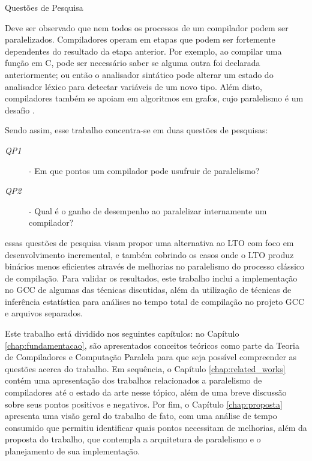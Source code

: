 \begin{section}{Questões de Pesquisa}

Deve ser observado que nem todos os processos de um compilador podem ser
paralelizados. Compiladores operam em etapas que podem ser fortemente
dependentes do resultado da etapa anterior. Por exemplo, ao compilar uma
função em C, pode ser necessário saber se alguma outra foi declarada anteriormente; ou
então o analisador sintático pode alterar um estado do analisador léxico para
detectar variáveis de um novo tipo. Além disto, compiladores também se apoiam em algoritmos
em grafos, cujo paralelismo é um desafio \citep{lumsdaine2007challenges}.

Sendo assim, esse trabalho concentra-se em duas questões de pesquisas:
\begin{description}
    \item[\textit{QP1}] - Em que pontos um compilador pode usufruir de paralelismo?

    \item[\textit{QP2}] - Qual é o ganho de desempenho ao paralelizar internamente um compilador?
\end{description}
essas questões de pesquisa visam propor uma alternativa ao LTO com foco
em desenvolvimento incremental, e também cobrindo os casos onde o LTO produz binários menos
eficientes através de melhorias no paralelismo do processo clássico de compilação.
Para validar os resultados, este trabalho inclui a implementação no GCC de algumas das
técnicas discutidas, além da utilização de técnicas de inferência estatística para
análises no tempo total de compilação no projeto GCC e arquivos separados.

Este trabalho está dividido nos seguintes capítulos: no Capítulo
\ref{chap:fundamentacao}, são apresentados conceitos teóricos como parte da
Teoria de Compiladores e Computação Paralela para que seja possível
compreender as questões acerca do trabalho.  Em sequência, o Capítulo
\ref{chap:related_works} contém uma apresentação dos trabalhos relacionados
a paralelismo de compiladores até o estado da
arte nesse tópico, além de uma breve discussão sobre seus pontos positivos
e negativos. Por fim, o Capítulo \ref{chap:proposta} apresenta uma visão geral
do trabalho de fato, com uma análise de tempo consumido que permitiu
identificar quais pontos necessitam de melhorias, além da
proposta do trabalho, que contempla a arquitetura de paralelismo e o
planejamento de sua implementação.



\end{section}
